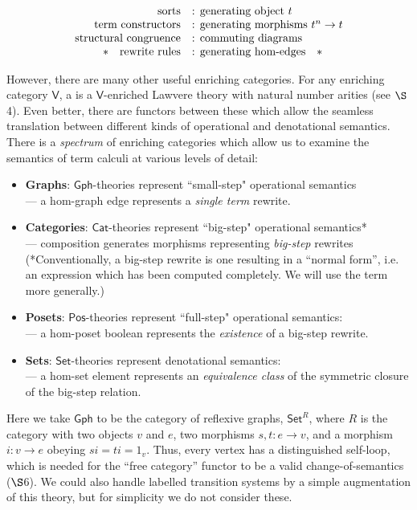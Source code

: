 \documentclass{amsart}
\newcommand{\define}[1]{{\bf \boldmath{#1}}}
\theoremstyle{definition}
\newcommand{\Gph}{\mathsf{Gph}}
\newcommand{\Set}{\mathsf{Set}}
\newcommand{\Cat}{\mathsf{Cat}}
\newcommand{\Pos}{\mathsf{Pos}}
\newcommand{\V}{\mathsf{V}}
\newcommand{\maps}{\colon}
\begin{document}
\[\begin{array}{rl}
\text{sorts} & \text{: generating object } t\\
\text{term constructors} & \text{: generating morphisms } t^n \to t\\
\text{structural congruence} & \text{: commuting diagrams}\\
\text{\textasteriskcentered \quad rewrite rules} & \text{: generating hom-edges\quad\textasteriskcentered}\\
\end{array}\]

However, there are many other useful enriching categories.  For any enriching category $\V$, a \define{$\V$-theory} is a $\V$-enriched Lawvere theory with natural number arities (see $\S$4). Even better, there are functors between these which allow the seamless translation between different kinds of operational and denotational semantics.  There is a \textit{spectrum} of enriching categories which allow us to examine the semantics of term calculi at various levels of detail:

\begin{itemize}
\item 
\textbf{Graphs}: $\Gph$-theories represent ``small-step" operational semantics \\ --- a hom-graph edge represents a \textit{single term} rewrite.
\item
\textbf{Categories}: $\Cat$-theories represent ``big-step" operational semantics*\\ --- composition generates morphisms representing \textit{big-step} rewrites\\ (*Conventionally, a big-step rewrite is one resulting in a ``normal form'', i.e. an expression which has been computed completely. We will use the term more generally.) 
\item
\textbf{Posets}: $\Pos$-theories represent ``full-step" operational semantics:\\ --- a hom-poset boolean represents the \textit{existence} of a big-step rewrite.
\item
\textbf{Sets}: $\Set$-theories represent denotational semantics: \\ --- a hom-set element represents an \textit{equivalence class} of the symmetric closure of the big-step relation.
\end{itemize}
Here we take $\Gph$ to be the category of reflexive graphs, $\Set^R$, where $R$ is the category with two objects $v$ and $e$, two morphisms $s,t \maps e \to v$, and a morphism $i \maps v \to e$ obeying $si = ti = 1_v$.  Thus, every vertex has a distinguished self-loop, which is needed for the ``free category'' functor to be a valid change-of-semantics ($\S$6).   We could also handle labelled transition systems by a simple augmentation of this theory, but for simplicity we do not consider these.
\end{document}
